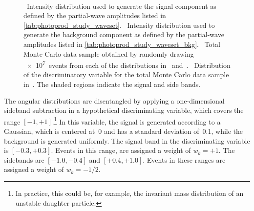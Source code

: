 \begin{figure}[tbp]
  \centering%
  \\%
  \caption{~Intensity
  distribution used to generate the signal component as defined by the
  partial-wave amplitudes listed in
  \cref{tab:photoprod_study_waveset}.
  ~Intensity
  distribution used to generate the background component as defined by
  the partial-wave amplitudes listed in
  \cref{tab:photoprod_study_waveset_bkg}.
  ~Total Monte
  Carlo data sample obtained by randomly drawing \num{e7}~events from
  each of the distributions
  in~
  and~.
  ~Distribution
  of the discriminatory variable for the total Monte Carlo data sample
  in~.  The
  shaded regions indicate the signal and side bands.}%
  \label{fig:photoprod_study_weighted}%
\end{figure}

The angular distributions are disentangled by applying a
one-dimensional sideband subtraction in a hypothetical discriminating
variable, which covers the range $[-1, +1]$.\footnote{In practice,
this could be, for example, the invariant mass distribution of an
unstable daughter particle.}  In this variable, the signal is
generated according to a Gaussian, which is centered at~0 and has a
standard deviation of~0.1, while the background is generated
uniformly.  The signal band in the discriminating variable is $[-0.3,
+0.3]$.  Events in this range, are assigned a weight of $w_k = +1$.
The sidebands are $[-1.0, -0.4]$ and $[+0.4, +1.0]$.  Events in these
ranges are assigned a weight of $w_k = -1/2$.

